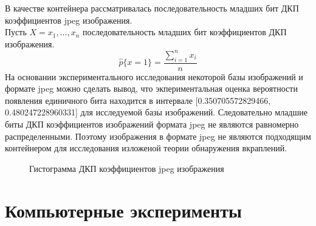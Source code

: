 \documentclass[a4paper,12pt]{article}
\theoremstyle{plain}
\begin{document}
В качестве контейнера рассматривалась последовательность младших бит ДКП коэффициентов jpeg изображения.\\
Пусть $X={x_1,..., x_n}$ последовательность младших бит коэффициентов ДКП изображения.
\begin{equation}
\hat{p}\{x=1\}=\frac{\sum^n_{i=1}x_i}{n}
\end{equation}
На основании экспериментального исследования некоторой базы изображений и формате jpeg можно сделать вывод, что экпериментальная оценка вероятности появления единичного бита находится в интервале  [0.350705572829466, 0.480247228960331] для исследуемой базы изображений. Следовательно младшие биты ДКП коэффициентов изображений формата jpeg не являются равномерно распределенными. Поэтому изображения в формате jpeg не являются подходящим контейнером для исследования изложеной теории обнаружения вкраплений. \\
\begin{figure}[h]
	\caption{Гистограмма ДКП коэффициентов jpeg изображения}
	\label{ris:"hist1.png"}
\end{figure}
\clearpage
\newpage
\section{Компьютерные эксперименты}
 
\end{document}
